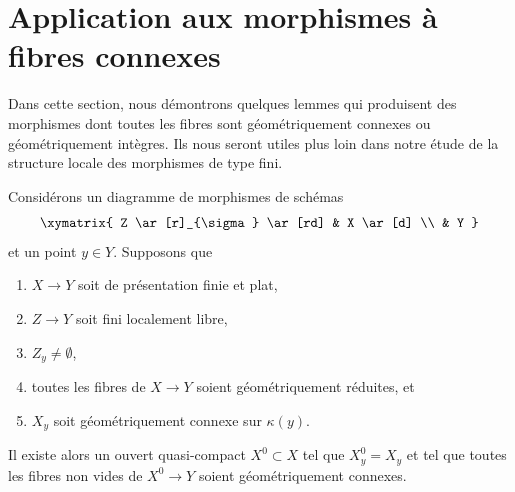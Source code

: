 \section{Application aux morphismes à fibres connexes}
\label{section-application-geometrically-connected}

\noindent
Dans cette section, nous démontrons quelques lemmes qui produisent des morphismes
dont toutes les fibres sont géométriquement connexes ou géométriquement intègres.
Ils nous seront utiles plus loin dans notre étude de la structure locale des morphismes
de type fini.

\begin{lemma}
\label{lemma-descent-connected-fibres}
Considérons un diagramme de morphismes de schémas
$$
\xymatrix{
Z \ar[r]_{\sigma} \ar[rd] & X \ar[d] \\
& Y
}
$$
et un point $y \in Y$. Supposons que
\begin{enumerate}
\item $X \to Y$ soit de présentation finie et plat,
\item $Z \to Y$ soit fini localement libre,
\item $Z_y \not = \emptyset$,
\item toutes les fibres de $X \to Y$ soient géométriquement réduites, et
\item $X_y$ soit géométriquement connexe sur $\kappa(y)$.
\end{enumerate}
Il existe alors un ouvert quasi-compact $X^0 \subset X$ tel que $X^0_y = X_y$
et tel que toutes les fibres non vides de $X^0 \to Y$ soient géométriquement connexes.
\end{lemma}

